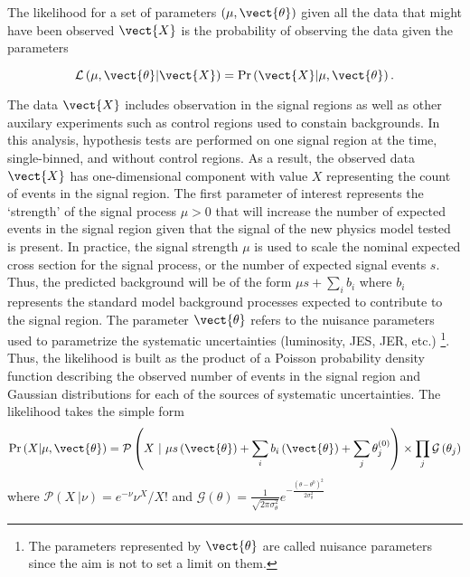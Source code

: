 The likelihood for a set of parameters $\left(\mu,  \vect{\theta}\right)$
given all the data that might have been observed  $\vect{X}$ is the probability 
of observing the data given the parameters

\begin{equation}
\mathcal{L} \left( \mu, \vect{\theta} \rvert \vect{X} \right) = 
\Pr\left(\vect{X} \rvert \mu, \vect{\theta} \right).
\end{equation}

The data $\vect{X}$ includes observation in the signal regions as well as 
other auxilary experiments such as control regions used to constain 
backgrounds. 
In this analysis, hypothesis tests are performed on one signal region 
at the time, single-binned, and without control regions. 
As a result, the observed data $\vect{X}$ has one-dimensional component 
with value $X$ representing the count of events in the signal region.
The first parameter of interest represents the `strength' of 
the signal process $\mu > 0$ that will increase the number of 
expected events in the signal region given that the signal of the new physics 
model tested is present. In practice, the signal strength $\mu$ is used to 
scale the nominal expected cross section for the signal process, or the
number of expected signal events $s$. 
Thus, the predicted background will be of the form $\mu s + \sum_i b_i$ where 
$b_i$ represents the standard model background processes expected to 
contribute to the signal region. 
The parameter $\vect{\theta}$ refers to 
the nuisance parameters used to parametrize the systematic uncertainties
(luminosity, JES, JER, etc.)
\footnote{The parameters represented by $\vect{\theta}$ are called nuisance 
parameters since the aim is not to set a limit on them.}.
Thus, the likelihood is built as the product of a Poisson probability density 
function describing the observed number of events in the signal 
region and Gaussian distributions for each of the sources of systematic 
uncertainties.
The likelihood takes the simple form
\begin{equation}
\Pr\left(X \rvert \mu, \vect{\theta} \right) = 
\mathcal{P} \left(X~\rvert~\mu s\left(\vect{\theta}\right)
+ \sum_i b_i\left(\vect{\theta}\right)
+ \sum_j \theta_{j}^{\left(0\right)}
\right)
\times  
\prod_{j}  \mathcal{G} \left(\theta_{j}\right)
\end{equation}
where $\mathcal{P} \left(X~\rvert \nu\right) = e^{-\nu}\nu^X/X!$ 
and $\mathcal{G} \left(\theta\right)  = \frac{1}{\sqrt{2\pi\sigma_{\theta}^2}}
e^{-\frac{\left(\theta-\theta^0\right)^2}{2\sigma_\theta^2}}$
